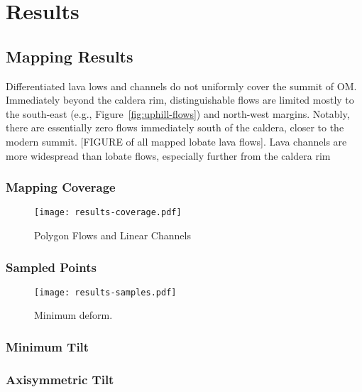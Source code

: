 \chapter{Results}

\section{Mapping Results}

Differentiated lava lows and channels do not uniformly cover the summit of \acf{OM}. Immediately beyond the caldera rim, distinguishable flows are limited mostly to the south-east (e.g., Figure~\ref{fig:uphill-flows}) and north-west margins. Notably, there are essentially zero flows immediately south of the caldera, closer to the modern summit. [FIGURE of all mapped lobate lava flows]. Lava channels are more widespread than lobate flows, especially further from the caldera rim 

\subsection{Mapping Coverage}
\begin{figure}
    \texttt{[image: results-coverage.pdf]}%
    \caption[Mapping Coverage]{Polygon Flows and Linear Channels}%
    \label{fig:results-coverage}
\end{figure}
\subsection{Sampled Points}
\begin{figure}
    \texttt{[image: results-samples.pdf]}%
    \caption[Sampling Coverage]{Minimum \acf{deform}.}%
    \label{fig:results-samples}
\end{figure}
\subsection{Minimum Tilt}
\subsection{Axisymmetric Tilt}


